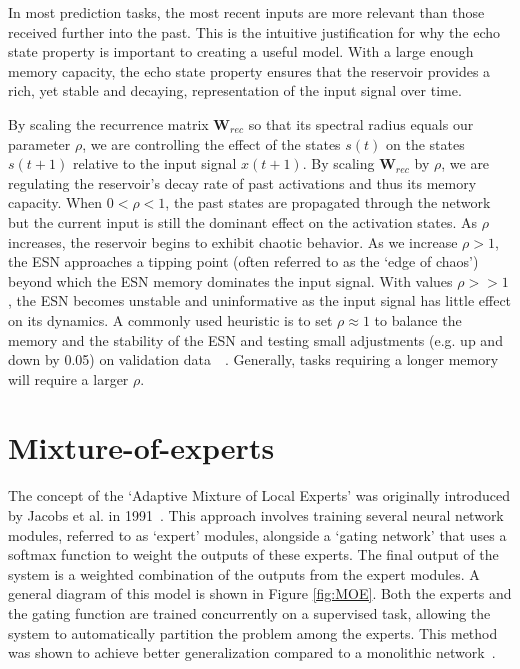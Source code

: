 In most prediction tasks, the most recent inputs are more relevant than those received further into the past. This is the intuitive justification for why the echo state property is important to creating a useful model. With a large enough memory capacity, the echo state property ensures that the reservoir provides a rich, yet stable and decaying, representation of the input signal over time.

By scaling the recurrence matrix $\mathbf{W}_{rec}$ so that its spectral radius equals our parameter $\rho$, we are controlling the effect of the states $s(t)$ on the states $s(t+1)$ relative to the input signal $x(t+1)$. By scaling $\mathbf{W}_{rec}$ by $\rho$, we are regulating the reservoir's decay rate of past activations and thus its memory capacity. When $0 < \rho < 1$, the past states are propagated through the network but the current input is still the dominant effect on the activation states. As $\rho$ increases, the reservoir begins to exhibit chaotic behavior. As we increase $\rho > 1$, the ESN approaches a tipping point (often referred to as the `edge of chaos') beyond which the ESN memory dominates the input signal. With values $\rho >> 1$, the ESN becomes unstable and uninformative as the input signal has little effect on its dynamics. A commonly used heuristic is to set $\rho \approx 1$ to balance the memory and the stability of the ESN and testing small adjustments (e.g. up and down by 0.05) on validation data~\cite{lukosevicius_and_jaeger_2009}~\cite{lukosevicius_2012_practical_guide}. Generally, tasks requiring a longer memory will require a larger $\rho$.



\section{Mixture-of-experts}

The concept of the `Adaptive Mixture of Local Experts' was originally introduced by Jacobs et al. in 1991~\cite{jacobs_1991}. This approach involves training several neural network modules, referred to as `expert' modules, alongside a `gating network' that uses a softmax function to weight the outputs of these experts. The final output of the system is a weighted combination of the outputs from the expert modules. A general diagram of this model is shown in Figure \ref{fig:MOE}. Both the experts and the gating function are trained concurrently on a supervised task, allowing the system to automatically partition the problem among the experts. This method was shown to achieve better generalization compared to a monolithic network~\cite{jacobs_1991}.

